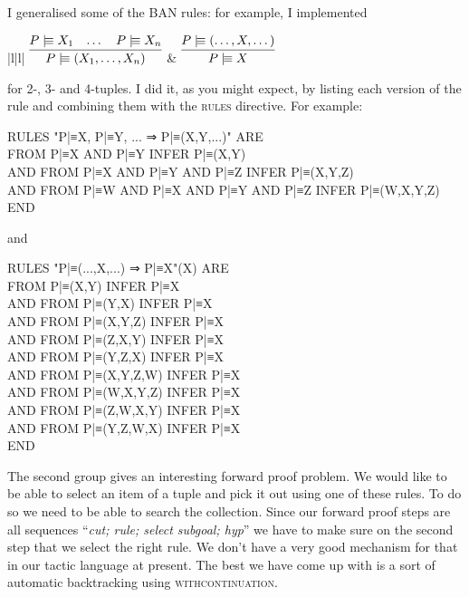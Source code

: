 I generalised some of the BAN rules: for example, I implemented
\begin{ruletab}{|l|l|} 
\hline
$\infer	{P \believes (X_{1},\dots,X_{n})}
		{P \believes X_{1}  & \dots & P \believes X_{n}}$ 
& 
$\infer	{P \believes X}
       	{P \believes (\dots,X,\dots) }$ 
\\
\hline 
\end{ruletab}
for 2-, 3- and 4-tuples. I did it, as you might expect, by listing each version of the rule and combining them with the \textsc{rules} directive. For example:

\begin{japeish}
RULES "P|≡X,  P|≡Y,  ... ⇒ P|≡(X,Y,...)" ARE \\
\tab \tab FROM P|≡X AND P|≡Y INFER P|≡(X,Y) \\
\tab AND    FROM P|≡X AND P|≡Y AND P|≡Z INFER P|≡(X,Y,Z) \\
\tab AND    FROM P|≡W AND P|≡X AND P|≡Y AND P|≡Z INFER P|≡(W,X,Y,Z) \\
END
\end{japeish}
and
\begin{japeish}
RULES "P|≡(...,X,...) ⇒ P|≡X"(X) ARE \\
\tab \tab FROM P|≡(X,Y) INFER P|≡X \\
\tab AND    FROM P|≡(Y,X) INFER P|≡X \\
\tab AND    FROM P|≡(X,Y,Z) INFER P|≡X \\
\tab AND    FROM P|≡(Z,X,Y) INFER P|≡X \\
\tab AND    FROM P|≡(Y,Z,X) INFER P|≡X \\
\tab AND    FROM P|≡(X,Y,Z,W) INFER P|≡X \\
\tab AND    FROM P|≡(W,X,Y,Z) INFER P|≡X \\
\tab AND    FROM P|≡(Z,W,X,Y) INFER P|≡X \\
\tab AND    FROM P|≡(Y,Z,W,X) INFER P|≡X \\
END
\end{japeish}

The second group gives an interesting forward proof problem. We would like to be able to select an item of a tuple and pick it out using one of these rules. To do so we need to be able to search the collection. Since our forward proof steps are all sequences ``\textit{cut; rule; select subgoal; hyp}'' we have to make sure on the second step that we select the right rule. We don't have a very good mechanism for that in our tactic language at present. The best we have come up with is a sort of automatic backtracking using \textsc{withcontinuation}.


